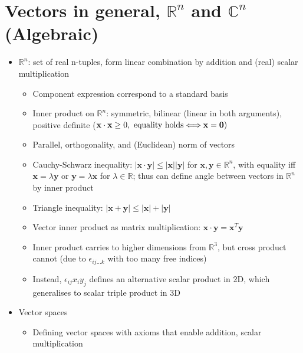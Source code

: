 \section{Vectors in general, $\mathbb{R}^{n}$ and $\mathbb{C}^{n}$ (Algebraic)}
\begin{itemize}
      \item $\mathbb{R}^{n}$: set of real n-tuples, form linear combination by
            addition and (real) scalar multiplication
            \begin{itemize}
                  \item Component expression correspond to a standard basis
                  \item Inner product on $\mathbb{R}^{n}$: symmetric, bilinear (linear in
                        both arguments), positive definite ($\mathbf{x}\cdot\mathbf{x}\geq0,\textrm{ equality holds\ensuremath{\iff}}\mathbf{x}=\mathbf{0})$
                  \item Parallel, orthogonality, and (Euclidean) norm of vectors
                  \item Cauchy-Schwarz inequality: $|\mathbf{x\cdot y}|\leq|\mathbf{x}||\mathbf{y}|$
                        for $\mathbf{x},\mathbf{y}\in\mathbb{R}^{n}$, with equality iff $\mathbf{x}=\lambda\mathbf{y}$
                        or $\mathbf{y}=\lambda\mathbf{x}$ for $\lambda\in\mathbb{R}$; thus
                        can define angle between vectors in $\mathbb{R}^{n}$ by inner product
                  \item Triangle inequality: $|\mathbf{x+y}|\leq|\mathbf{x}|+|\mathbf{y}|$
                  \item Vector inner product as matrix multiplication: $\mathbf{x\cdot y}=\mathbf{x}^{T}\mathbf{y}$
                  \item Inner product carries to higher dimensions from $\mathbb{R}^{3}$,
                        but cross product cannot (due to $\epsilon_{ij...k}$ with too many
                        free indices)
                  \item Instead, $\epsilon_{ij}x_{i}y_{j}$ defines an alternative scalar
                        product in 2D, which generalises to scalar triple product in 3D
            \end{itemize}
      \item Vector spaces
            \begin{itemize}
                  \item Defining vector spaces with axioms that enable addition, scalar multiplication

\end{itemize}
\end{itemize}
